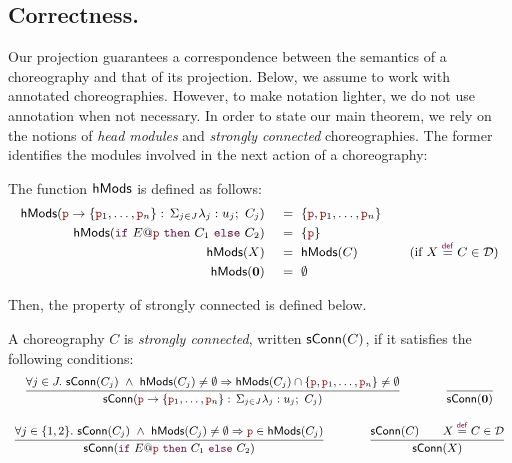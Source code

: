 \subsection{Correctness.}
Our projection guarantees a correspondence between the semantics of a
choreography and that of its projection. Below, we assume to work with
annotated choreographies. However, to make notation lighter, we do not
use annotation when not necessary.
%
In order to state our main theorem, we rely on the notions of
\emph{head modules} and \emph{strongly connected} choreographies. The
former identifies the modules involved in the next action of a
choreography:
\begin{definition}
  The function $\mathsf{hMods}$ is defined as follows:
  \begin{displaymath}\small
    \begin{array}{rll}
      \hmodules(\interact{\nr}{\nr_1,\ldots,\nr_n})\
      & = \ \{\nr, \nr_1,\dots,\nr_n\}\\[1mm]
      \hmodules(\ifTE {E}{\nr}{C_1}{C_2}) \ & =\ \{\nr\}\\
      \hmodules(X) \ & =\ \hmodules (C)\qquad\qquad(\text{if }
                       X\defrec C\in\defin)\\[1mm]
      \hmodules(\CEnd) \ & =\ \emptyset
    \end{array}
  \end{displaymath}
\end{definition}
Then, the property of strongly connected is defined below.
%
\begin{definition}
  A choreography $C$ is \emph{strongly connected}, written
  $\mathsf{sConn}(C)$, if it satisfies the following conditions:
  \begin{displaymath}\small
    \begin{array}{c}
      \infer {
      \sconnected(\interact{\nr}{\nr_1,\ldots,\nr_n})
      } {
      \forall j\in J.\ \sconnected(C_j)\ \land\ \hmodules(C_j)\neq\emptyset\Rightarrow
      \hmodules(C_j)\cap\{\nr, \nr_1,\dots,\nr_n\}\neq\emptyset
      }      
      \qquad\qquad
      \infer {
      \sconnected(\CEnd)
      } {
      }
      \\\\

      \infer {
      \sconnected(\ifTE {E}{\nr}{C_1}{C_2})
      } {
      \forall j\in \{1,2\}.\ \sconnected(C_j)\ \land\ \hmodules(C_j)
      \neq\emptyset\Rightarrow \nr\in\hmodules(C_j)
      }      
      \qquad\qquad
      \infer {
      \sconnected(X)
      } {
      \sconnected(C)\qquad X\defrec C\in\defin
        }
      \\\\
    \end{array}
  \end{displaymath}
\end{definition}
